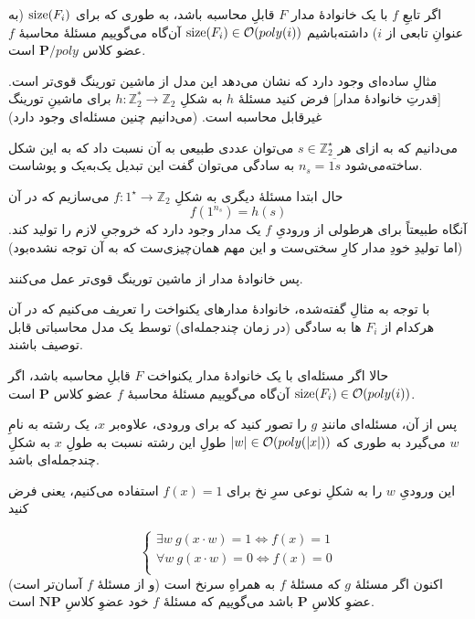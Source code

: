 اگر تابعِ \(f\) با یک خانوادهٔ مدار \(F\) قابلِ محاسبه باشد، به طوری که برای
\(\operatorname{size}(F_i)\)
(به عنوانِ تابعی از \(i\)) داشته‌باشیم
\(\operatorname{size}(F_i) \in \mathcal{O}(poly(i))\)
آن‌گاه می‌گوییم مسئلهٔ محاسبهٔ \(f\) عضو کلاس 
\(\mathbf{P}/poly\)
است.

مثالِ ساده‌ای وجود دارد که نشان می‌دهد این مدل از ماشین تورینگ قوی‌تر است.
[قدرتِ خانوادهٔ مدار]
فرض کنید مسئلهٔ \(h\) به شکلِ 
\( h: \mathbb{Z}_2^* \to \mathbb{Z}_2\)
برای ماشینِ تورینگ غیرقابل محاسبه است. (می‌دانیم چنین مسئله‌ای وجود دارد)

می‌دانیم که به ازای هر 
\(s \in \mathbb{Z}_2^\star\)
می‌توان عددی طبیعی به آن نسبت داد که به این شکل ساخته‌می‌شود
\(n_s = \overline{1 s}\)
به سادگی می‌توان گفت این تبدیل یک‌به‌یک و پوشاست.

حال ابتدا مسئلهٔ دیگری به شکلِ 
\(f: 1^\star \to \mathbb{Z}_2 \)
می‌سازیم که در آن 
\begin{equation} f(1^{n_s}) = h(s) \end{equation}
آنگاه طبیعتاً برای هرطولی از ورودیِ \(f\) یک مدار وجود دارد که خروجیِ لازم را تولید کند. (اما تولیدِ خودِ مدار کارِ سختی‌ست و این مهم همان‌چیزی‌ست که به آن توجه نشده‌بود)

پس خانوادهٔ مدار از ماشین تورینگ قوی‌تر عمل می‌کنند. 

با توجه به مثالِ گفته‌شده، خانوادهٔ مدارهای یکنواخت را تعریف می‌کنیم که در آن هرکدام از
\(F_i\)
ها به سادگی (در زمان چندجمله‌ای) توسط یک مدل محاسباتی قابل توصیف باشند.

حالا اگر مسئله‌ای با یک خانوادهٔ مدار یکنواخت \(F\) قابلِ محاسبه باشد، اگر
\(\operatorname{size}(F_i) \in \mathcal{O}(poly(i))\)
آن‌گاه می‌گوییم مسئلهٔ محاسبهٔ \(f\) عضو کلاس 
\(\mathbf{P}\)
است.
 
پس از آن، مسئله‌ای مانندِ \(g\) را تصور کنید که برای ورودی، علاوه‌بر \(x\)، یک رشته به نامِ \(w\) می‌گیرد به طوری که 
\(
    |w| \in \mathcal{O}(poly(|x|))
\)
طولِ این رشته نسبت به طولِ \(x\) به شکلِ چندجمله‌ای باشد.


این ورودیِ \(w\) را به شکلِ نوعی سرِ نخ برای \(f(x)=1\) استفاده می‌کنیم، یعنی فرض کنید

\begin{equation}
    \begin{cases}
    \exists w ~ g(x \cdot w) = 1 \Leftrightarrow f(x) = 1 \\
    \forall w ~ g(x \cdot w) = 0 \Leftrightarrow f(x) = 0 \\
    \end{cases}
\end{equation} 
اکنون اگر مسئلهٔ \(g\) که مسئلهٔ \(f\) به همراهِ سرنخ است (و از مسئلهٔ \(f\) آسان‌تر است) عضوِ کلاسِ 
\( \mathbf{P} \)
باشد می‌گوییم که مسئلهٔ \(f\) خود عضوِ کلاسِ
\( \mathbf{NP} \)
است.

